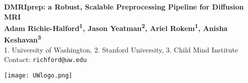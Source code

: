 \documentclass[a0, landscape]{a0poster}
\begin{document}


\begin{minipage}[b]{0.88\linewidth}
\veryHuge \color{NavyBlue} \textbf{DMRIprep: a Robust, Scalable Preprocessing Pipeline for Diffusion MRI} \color{Black}\\ %
\huge \textbf{Adam Richie-Halford\textsuperscript{1}, Jason Yeatman\textsuperscript{2}, Ariel Rokem\textsuperscript{1}, Anisha Keshavan\textsuperscript{3}}\\ %
\Large 1. University of Washington, 2. Stanford University, 3. Child Mind Institute \\ %
\Large Contact: \texttt{richford@uw.edu}
\end{minipage}
%
%
\begin{minipage}[b]{0.19\linewidth}
\texttt{[image: UWlogo.png]}
\end{minipage}

\vspace{0.5cm} %

\end{document}
